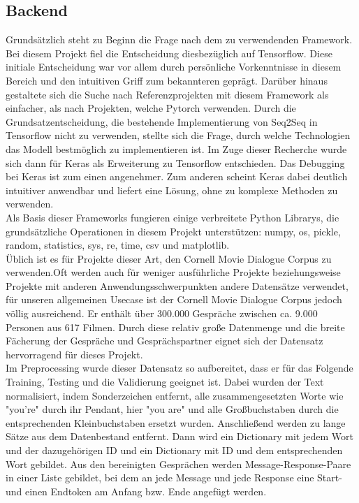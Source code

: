 \documentclass{aa}
\begin{document}
    \subsection{Backend}\label{sec:backend}
        Grundsätzlich steht zu Beginn die Frage nach dem zu verwendenden Framework. Bei diesem Projekt fiel die Entscheidung diesbezüglich  auf Tensorflow. Diese initiale Entscheidung war vor allem durch persönliche Vorkenntnisse in diesem Bereich und den intuitiven Griff zum bekannteren geprägt. Darüber hinaus gestaltete sich die Suche nach Referenzprojekten mit diesem Framework als einfacher, als nach Projekten, welche Pytorch verwenden. Durch die Grundsatzentscheidung, die bestehende Implementierung von Seq2Seq in Tensorflow nicht zu verwenden, stellte sich die Frage, durch welche Technologien das Modell bestmöglich zu implementieren ist. Im Zuge dieser Recherche wurde sich dann für Keras als Erweiterung zu Tensorflow entschieden. Das Debugging bei Keras ist zum einen angenehmer. Zum anderen scheint Keras dabei deutlich intuitiver anwendbar und liefert eine Lösung, ohne zu komplexe Methoden zu verwenden. \\
        Als Basis dieser Frameworks fungieren einige verbreitete Python Librarys, die grundsätzliche Operationen in diesem Projekt unterstützen: numpy, os, pickle, random, statistics, sys, re, time, csv und  matplotlib. \\
        Üblich ist es für Projekte dieser Art, den Cornell Movie Dialogue Corpus zu verwenden.Oft werden auch für weniger ausführliche Projekte beziehungsweise Projekte mit anderen Anwendungsschwerpunkten andere Datensätze verwendet, für unseren allgemeinen Usecase ist der Cornell Movie Dialogue Corpus jedoch völlig ausreichend. Er enthält über 300.000 Gespräche zwischen ca. 9.000 Personen aus 617 Filmen. Durch diese relativ große Datenmenge und die breite Fächerung der Gespräche und Gesprächspartner eignet sich der Datensatz hervorragend für dieses Projekt. \\
        Im Preprocessing wurde dieser Datensatz so aufbereitet, dass er für das Folgende Training, Testing und die Validierung geeignet ist. Dabei wurden der Text normalisiert, indem Sonderzeichen entfernt, alle zusammengesetzten Worte wie "you're" durch ihr Pendant, hier "you are" und alle Großbuchstaben durch die entsprechenden Kleinbuchstaben ersetzt wurden. Anschließend werden zu lange Sätze aus dem Datenbestand entfernt. Dann wird ein Dictionary mit jedem Wort und der dazugehörigen ID und ein Dictionary mit ID und dem entsprechenden Wort gebildet. Aus den bereinigten Gesprächen werden Message-Response-Paare in einer Liste gebildet, bei dem an jede Message und jede Response eine Start- und einen Endtoken am Anfang bzw. Ende angefügt werden. \\
\end{document}
